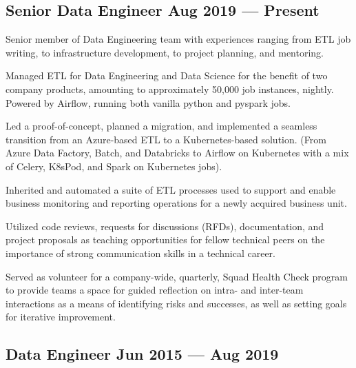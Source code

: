 \documentclass[letter,10pt]{article}
\begin{document}
\subsection{{Senior Data Engineer \hfill Aug 2019 --- Present}}

\vspace{10pt}

Senior member of Data Engineering team with experiences ranging from ETL job writing, to infrastructure development, to project planning, and mentoring.

\vspace{10pt}

\begin{zitemize}
    \item Managed ETL for Data Engineering and Data Science for the benefit of two company products, amounting to approximately 50,000 job instances, nightly. Powered by Airflow, running both vanilla python and pyspark jobs.
    \item Led a proof-of-concept, planned a migration, and implemented a seamless transition from an Azure-based ETL to a Kubernetes-based solution. (From Azure Data Factory, Batch, and Databricks to Airflow on Kubernetes with a mix of Celery, K8sPod, and Spark on Kubernetes jobs).
    \item Inherited and automated a suite of ETL processes used to support and enable business monitoring and reporting operations for a newly acquired business unit.
    \item Utilized code reviews, requests for discussions (RFDs), documentation, and project proposals as teaching opportunities for fellow technical peers on the importance of strong communication skills in a technical career.
    \item Served as volunteer for a company-wide, quarterly, Squad Health Check program to provide teams a space for guided reflection on intra- and inter-team interactions as a means of identifying risks and successes, as well as setting goals for iterative improvement.
\end{zitemize}

\vspace{5pt}
\vspace{5pt}

\subsection{{Data Engineer \hfill Jun 2015 --- Aug 2019}}
\end{document}

